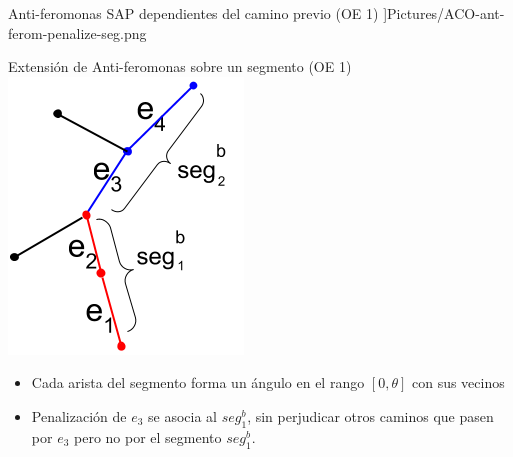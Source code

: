 \begin{frame}{Anti-feromonas SAP dependientes del camino previo (OE 1)}
                                                                                                                                                                                                                                                                                                                                                                                                                                                                                                                                                                                        ]{Pictures/ACO-ant-ferom-penalize-seg.png}
\end{frame}


\begin{frame}{Extensi\'on de Anti-feromonas sobre un segmento (OE 1)}
\centering
\includegraphics[scale=0.4]{Pictures/ant_segments_simple_case.png}
    \begin{itemize}
        \item Cada arista del segmento forma un \'angulo en el rango $[0, \theta]$ con sus vecinos
        \item Penalizaci\'on de $e_3$ se asocia al $seg^{b}_{1}$, sin perjudicar otros caminos que pasen por $e_3$ pero no por el segmento $seg^{b}_{1}$.
    \end{itemize}
\end{frame}

